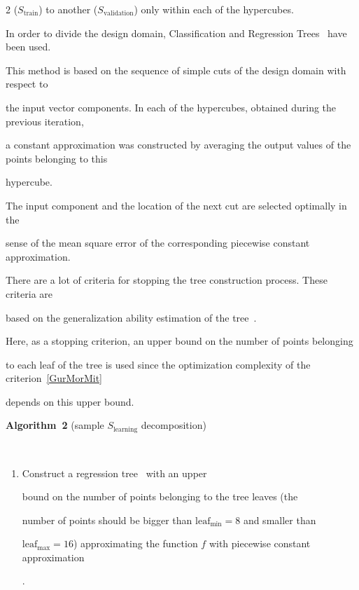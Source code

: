 \begin{multicols}{2}
 ($S_{\mathrm{train}}$) to another  ($S_{\mathrm{validation}}$) only within each of the hypercubes.

 

In order to divide the design domain, Classification and Regression Trees~\cite{CART} have been used. 

This method is based on the sequence of simple cuts of the design domain with respect to 

the input vector components. In each of the hypercubes, obtained during the previous iteration, 

a constant approximation was constructed by averaging the output values of the points belonging to this 

hypercube.

The input component and the location of the next cut are selected optimally in the 

sense of the mean square error of the corresponding piecewise constant approximation.

There are a lot of criteria for stopping the tree construction process. These criteria are 

based on the generalization ability estimation of the tree~\cite{elementsOfStatLearning}. 

Here, as a stopping criterion, an upper bound on the number of points belonging 

to each leaf of the tree is used since the optimization complexity of the criterion~\eqref{GurMorMit} 

depends on this upper bound.



\medskip



\noindent

\textbf{Algorithm~2} (sample $S_{\mathrm{learning}}$ decomposition) %

\ 

\noindent

  \begin{enumerate}

    \item {Construct a regression tree~\cite{CART} with an upper 

    bound on the number of points belonging to the tree leaves (the 

    number of points should be bigger than $\mathrm{leaf}_{\min} = 8$ and smaller than 

    $\mathrm{leaf}_{\max}=16$) approximating the function $f$ with piecewise constant approximation}. 


\end{enumerate}
\end{multicols}
